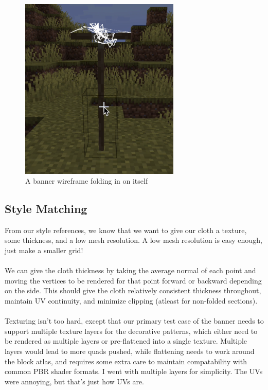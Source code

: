 \documentclass[12pt]{article}
\begin{document}
\begin{figure}[h]
    \begin{center}
        \includegraphics[width=3in]{images/thescrungle.png}
    \end{center}
    \caption{A banner wireframe folding in on itself}
\end{figure}

\subsection{Style Matching}

From our style references, we know that we want to give our cloth a texture, some thickness, and a low mesh resolution. A low mesh resolution is easy enough, just make a smaller grid!\\
\\
We can give the cloth thickness by taking the average normal of each point and moving the vertices to be rendered for that point forward or backward depending on the side. This should give the cloth relatively consistent thickness throughout, maintain UV continuity, and minimize clipping (atleast for non-folded sections).\\
\\
Texturing isn't too hard, except that our primary test case of the banner needs to support multiple texture layers for the decorative patterns, which either need to be rendered as multiple layers or pre-flattened into a single texture. Multiple layers would lead to more quads pushed, while flattening needs to work around the block atlas, and requires some extra care to maintain compatability with common PBR shader formats. I went with multiple layers for simplicity. The UVs were annoying, but that's just how UVs are.\\
\end{document}
